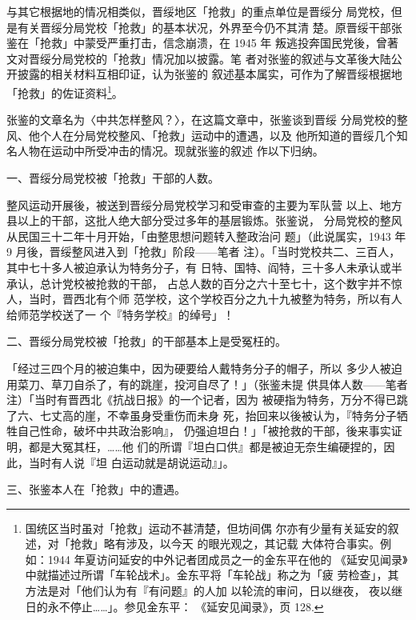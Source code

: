 与其它根据地的情况相类似，晋绥地区「抢救」的重点单位是晋绥分 局党校，但
是有关晋绥分局党校「抢救」的基本状况，外界至今仍不其清 楚。原晋绥干部张
鉴在「抢救」中蒙受严重打击，信念崩溃，在 1945 年 叛逃投奔国民党後，曾著
文对晋绥分局党校的「抢救」情况加以披露。笔 者对张鉴的叙述与文革後大陆公
开披露的相关材料互相印证，认为张鉴的 叙述基本属实，可作为了解晋绥根据地
「抢救」的佐证资料\footnote{国统区当时虽对「抢救」运动不甚清楚，但坊间偶
尔亦有少量有关延安的叙述，对「抢救」略有涉及，以今天 的眼光观之，其记载
大体符合事实。例如：1944 年夏访问延安的中外记者团成员之一的金东平在他的
《延安见闻录》中就描述过所谓「车轮战术」。金东平将「车轮战」称之为「疲
劳检查」，其方法是对「他们认为有『有问题』的人加 以轮流的审问，日以继夜，
夜以继日的永不停止……」。参见金东平： 《延安见闻录》，页 128.}。

张鉴的文章名为〈中共怎样整风？〉，在这篇文章中，张鉴谈到晋绥
分局党校的整风、他个人在分局党校整风、「抢救」运动中的遭遇，以及
他所知道的晋绥几个知名人物在运动中所受冲击的情况。现就张鉴的叙述
作以下归纳。

一、晋绥分局党校被「抢救」干部的人数。

整风运动开展後，被送到晋绥分局党校学习和受审查的主要为军队营
以上、地方县以上的干部，这批人绝大部分受过多年的基层锻炼。张鉴说，
分局党校的整风从民国三十二年十月开始，「由整思想问题转入整政治问
题」（此说属实，1943 年 9 月後，晋绥整风进入到「抢救」阶段——笔者
注）。「当时党校共二、三百人，其中七十多人被迫承认为特务分子，有
日特、国特、阎特，三十多人未承认或半承认，总计党校被抢救的干部，
占总人数的百分之六十至七十，这个数宇并不惊人，当时，晋西北有个师
范学校，这个学校百分之九十九被整为特务，所以有人给师范学校送了一
个『特务学校』的绰号」！

二、晋绥分局党校被「抢救」的干部基本上是受冤枉的。

「经过三四个月的被迫集中，因为硬要给人戴特务分子的帽子，所以
多少人被迫用菜刀、草刀自杀了，有的跳崖，投河自尽了！」（张鉴未提
供具体人数——笔者注）「当时有晋西北《抗战日报》的一个记者，因为
被硬指为特务，万分不得已跳了六、七丈高的崖，不幸虽身受重伤而未身
死，抬回来以後被认为，『特务分子牺牲自己性命，破坏中共政治影响』，
仍强迫坦白！」「被抢救的干部，後来事实证明，都是大冤其枉，……他
们的所谓『坦白口供』都是被迫无奈生编硬捏的，因此，当时有人说『坦
白运动就是胡说运动』」。

三、张鉴本人在「抢救」中的遭遇。

